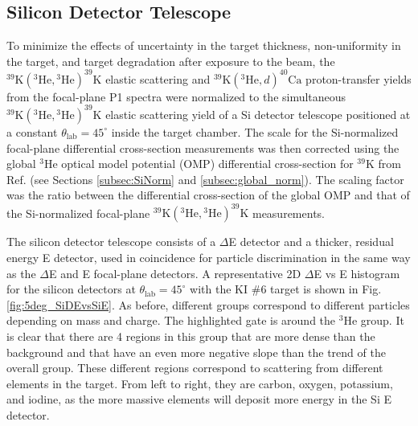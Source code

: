 \subsection{Silicon Detector Telescope} \label{subsec:SiDet}

To minimize the effects of uncertainty in the target thickness, non-uniformity in the target, and target degradation after exposure to the beam, the $^{39}\mathrm{K}(^{3}\mathrm{He}, {}^{3}\mathrm{He})^{39}\mathrm{K}$ elastic scattering and $^{39}\mathrm{K}(^{3}\mathrm{He}, d)^{40}\mathrm{Ca}$ proton-transfer yields from the focal-plane P1 spectra were normalized to the simultaneous $^{39}\mathrm{K}(^{3}\mathrm{He}, {}^{3}\mathrm{He})^{39}\mathrm{K}$ elastic scattering yield of a Si detector telescope positioned at a constant $\theta_{\mathrm{lab}} = 45^{\circ}$ inside the target chamber. The scale for the Si-normalized focal-plane differential cross-section measurements was then corrected using the global $^{3}\mathrm{He}$ optical model potential (OMP) differential cross-section for $^{39}\mathrm{K}$ from Ref. \cite{Liang2009} (see Sections \ref{subsec:SiNorm} and \ref{subsec:global_norm}). The scaling factor was the ratio between the differential cross-section of the global OMP and that of the Si-normalized focal-plane $^{39}\mathrm{K}(^{3}\mathrm{He}, {}^{3}\mathrm{He})^{39}\mathrm{K}$ measurements.

The silicon detector telescope consists of a $\Delta$E detector and a thicker, residual energy E detector, used in coincidence for particle discrimination in the same way as the $\Delta$E and E focal-plane detectors. A representative 2D $\Delta$E vs E histogram for the silicon detectors at $\theta_{\mathrm{lab}} = 45^{\circ}$ with the KI $\#$6 target is shown in Fig. \ref{fig:5deg_SiDEvsSiE}. As before, different groups correspond to different particles depending on mass and charge. The highlighted gate is around the $^{3}$He group. It is clear that there are 4 regions in this group that are more dense than the background and that have an even more negative slope than the trend of the overall group. These different regions correspond to scattering from different elements in the target. From left to right, they are carbon, oxygen, potassium, and iodine, as the more massive elements will deposit more energy in the Si E detector. 

\def\yTS{1.175} %
\def\xTS{2.165} %
\def\sl{0.28} %
\def\su{0.4} %

